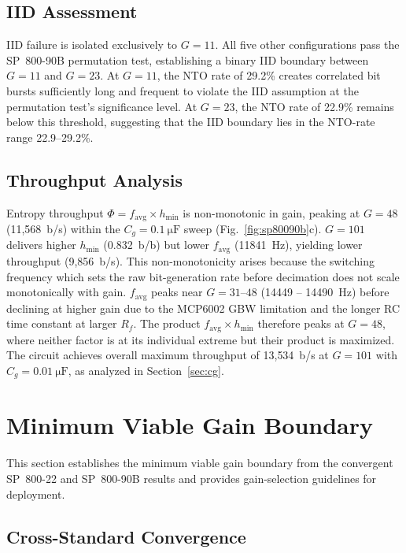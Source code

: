 \documentclass[conference]{IEEEtran}
\newcommand{\hmin}{\ensuremath{h_{\min}}}
\newcommand{\favg}{\ensuremath{f_{\mathrm{avg}}}}
\newcommand{\Cg}{\ensuremath{C_g}}
\newcommand{\Rf}{\ensuremath{R_f}}
\begin{document}
\subsection{IID Assessment}

IID failure is isolated exclusively to $G=11$. All five other
configurations pass the SP~800-90B permutation test, establishing a
binary IID boundary between $G=11$ and $G=23$. At $G=11$, the NTO rate of 29.2\% creates correlated bit
bursts sufficiently long and frequent to violate the IID assumption
at the permutation test's significance level. At $G=23$, the NTO
rate of 22.9\% remains below this threshold, suggesting that the IID
boundary lies in the NTO-rate range 22.9--29.2\%.


\subsection{Throughput Analysis}

Entropy throughput $\Phi=\favg\!\times\!\hmin$ is non-monotonic in
gain, peaking at $G=48$ (11{,}568~b/s) within the
$\Cg=\SI{0.1}{\micro\farad}$ sweep (Fig.~\ref{fig:sp80090b}c). $G=101$ delivers higher $\hmin$
(0.832~b/b) but lower $\favg$ (\SI{11841}{\hertz}), yielding lower
throughput (9{,}856~b/s). This non-monotonicity arises because the
switching frequency which sets the raw bit-generation rate before
decimation does not scale monotonically with gain. $\favg$ peaks
near $G=31$--$48$ (\SI{14449}{} -- \SI{14490}{\hertz}) before
declining at higher gain due to the MCP6002 GBW limitation and the
longer RC time constant at larger $\Rf$. The product
$\favg\!\times\!\hmin$ therefore peaks at $G=48$, where neither
factor is at its individual extreme but their product is maximized.
The circuit achieves overall maximum throughput of 13{,}534~b/s at $G=101$
with $\Cg=\SI{0.01}{\micro\farad}$, as analyzed in
Section~\ref{sec:cg}.

\section{Minimum Viable Gain Boundary}\label{sec:boundary}
This section establishes the minimum viable gain boundary from the
convergent SP~800-22 and SP~800-90B results and provides
gain-selection guidelines for deployment.
\subsection{Cross-Standard Convergence}
\end{document}
